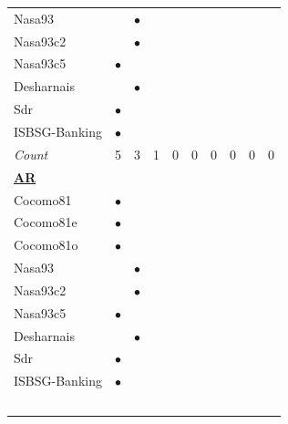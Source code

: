 \documentclass{sig-alternate}
\begin{document}
\begin{figure}[!t]
\begin{tabular}{lccccccccc|}
Nasa93	&		&	$\bullet$	&		&		&		&		&		&		&		\\
Nasa93c2	&		&	$\bullet$	&		&		&		&		&		&		&		\\
Nasa93c5	&	$\bullet$	&		&		&		&		&		&		&		&		\\
Desharnais	&		&	$\bullet$	&		&		&		&		&		&		&		\\
Sdr	&	$\bullet$	&		&		&		&		&		&		&		&		\\
ISBSG-Banking	&	$\bullet$	&		&		&		&		&		&		&		&		\\
\rowcolor{DarkGray}\em Count	&	5	&	3	&	1	&	0	&	0	&	0	&	0	&	0	&	0	\\

%
\hline\multicolumn{10}{l}{ \underline{{\bf AR}}}	\\
Cocomo81	&	$\bullet$	&		&		&		&		&		&		&		&		\\
Cocomo81e	&	$\bullet$	&		&		&		&		&		&		&		&		\\
Cocomo81o	&	$\bullet$	&		&		&		&		&		&		&		&		\\
Nasa93	&		&	$\bullet$	&		&		&		&		&		&		&		\\
Nasa93c2	&		&	$\bullet$	&		&		&		&		&		&		&		\\
Nasa93c5	&	$\bullet$	&		&		&		&		&		&		&		&		\\
Desharnais	&		&	$\bullet$	&		&		&		&		&		&		&		\\
Sdr	&	$\bullet$	&		&		&		&		&		&		&		&		\\
ISBSG-Banking	&	$\bullet$	&		&		&		&		&		&		&		&		\\\

\end{tabular}
\end{figure}
\end{document}
